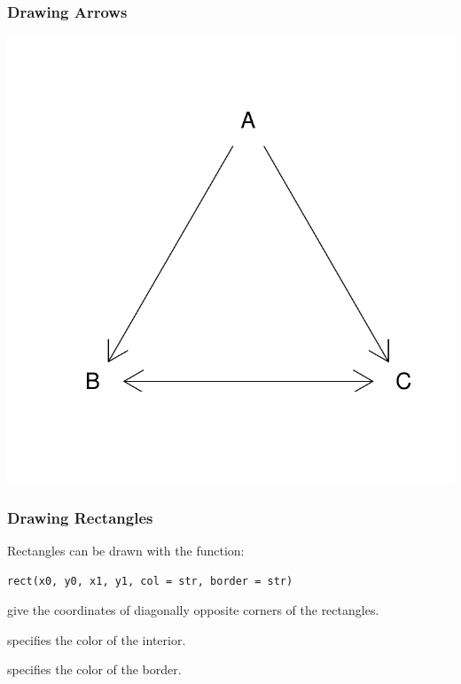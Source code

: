 \documentclass[12pt]{beamer}\usepackage[]{graphicx}\usepackage[]{color}
\newenvironment{knitrout}{}{} %
\begin{document}
\begin{frame}[fragile]
\frametitle{Drawing Arrows}
\begin{knitrout}\scriptsize
{}\color{fgcolor}

{\centering \includegraphics[width=.8\linewidth,height=.8\linewidth]{figure/arrows-1} 

}



\end{knitrout}
\end{frame}


\begin{frame}[fragile]
\frametitle{Drawing Rectangles}

Rectangles can be drawn with the function:
\begin{verbatim}
rect(x0, y0, x1, y1, col = str, border = str)
\end{verbatim}

\bi
  \item {} give the coordinates of diagonally opposite corners of the rectangles.
  \item {} specifies the color of the interior.
  \item {} specifies the color of the border.
\ei

\end{frame}

\end{document}
